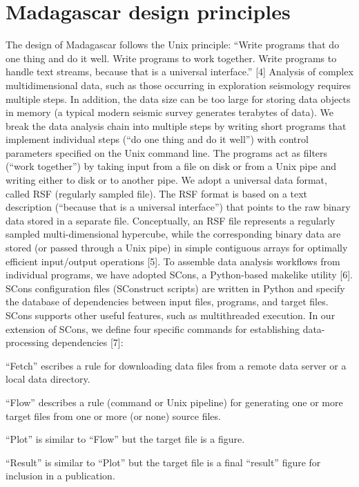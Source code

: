 \section{Madagascar design principles}

The design of Madagascar follows the Unix principle: ``Write
programs that do one thing and do it well. Write programs to work
together. Write programs to handle text streams, because that is a
universal interface.'' [4] Analysis of complex multidimensional
data, such as those occurring in exploration seismology requires
multiple steps. In addition, the data size can be too large for
storing data objects in memory (a typical modern seismic survey
generates terabytes of data). We break the data analysis chain into
multiple steps by writing short programs that implement individual
steps (``do one thing and do it well'') with control
parameters specified on the Unix command line. The programs act as
filters (``work together'') by taking input from a file
on disk or from a Unix pipe and writing either to disk or to another
pipe. We adopt a universal data format, called RSF (regularly sampled
file). The RSF format is based on a text description (``because
that is a universal interface'') that points to the raw binary
data stored in a separate file. Conceptually, an RSF file represents a
regularly sampled multi-dimensional hypercube, while the corresponding
binary data are stored (or passed through a Unix pipe) in simple
contiguous arrays for optimally efficient input/output operations [5].
To assemble data analysis workflows from individual programs, we have
adopted SCons, a Python-based makelike utility [6]. SCons
configuration files (SConstruct scripts) are written in Python and
specify the database of dependencies between input files, programs,
and target files. SCons supports other useful features, such as
multithreaded execution. In our extension of SCons, we define four
specific commands for establishing data-processing dependencies [7]:

``Fetch'' escribes a rule for downloading data
files from a remote data server or a local data directory. 
 
``Flow'' describes a rule (command or Unix pipeline) for
generating one or more target files from one or more (or none) source
files.
 
``Plot'' is similar to ``Flow'' but the target file is a figure.  

``Result'' is similar to ``Plot'' but the
target file is a final ``result'' figure for inclusion
in a publication.  

